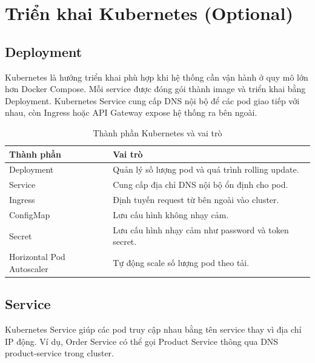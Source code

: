 \documentclass[../main.tex]{subfiles}
\begin{document}
\section{Triển khai Kubernetes (Optional)}
\label{section:4.8}

\subsection{Deployment}
\label{subsection:4.8.1}

Kubernetes là hướng triển khai phù hợp khi hệ thống cần vận hành ở quy mô lớn hơn Docker Compose. Mỗi service được đóng gói thành image và triển khai bằng Deployment. Kubernetes Service cung cấp DNS nội bộ để các pod giao tiếp với nhau, còn Ingress hoặc API Gateway expose hệ thống ra bên ngoài.

\begin{table}[H]
    \centering
    \caption{Thành phần Kubernetes và vai trò}
    \label{tab:chapter4-k8s-components}
    \begin{tabular}{|p{}|p{}|}
        \hline
        \rowcolor{primary!35}
        \textbf{Thành phần} & \textbf{Vai trò} \\
        \hline
        Deployment & Quản lý số lượng pod và quá trình rolling update. \\
        \hline
        Service & Cung cấp địa chỉ DNS nội bộ ổn định cho pod. \\
        \hline
        Ingress & Định tuyến request từ bên ngoài vào cluster. \\
        \hline
        ConfigMap & Lưu cấu hình không nhạy cảm. \\
        \hline
        Secret & Lưu cấu hình nhạy cảm như password và token secret. \\
        \hline
        Horizontal Pod Autoscaler & Tự động scale số lượng pod theo tải. \\
        \hline
    \end{tabular}
\end{table}

\subsection{Service}
\label{subsection:4.8.2}

Kubernetes Service giúp các pod truy cập nhau bằng tên service thay vì địa chỉ IP động. Ví dụ, Order Service có thể gọi Product Service thông qua DNS product-service trong cluster.
\end{document}
